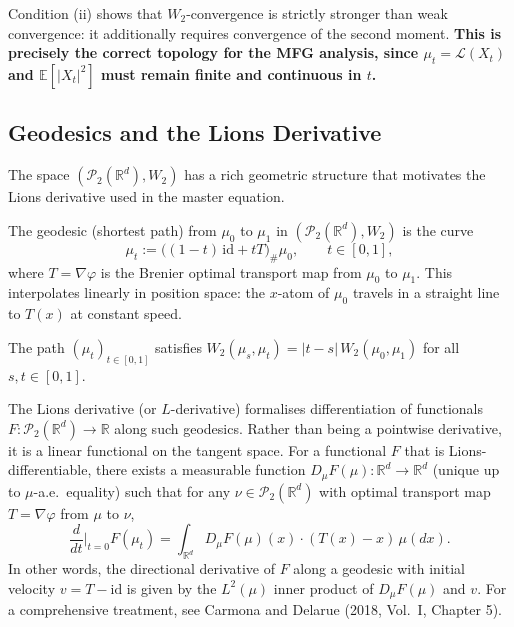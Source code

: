 Condition (ii) shows that $W_2$-convergence is strictly stronger than weak
convergence: it additionally requires convergence of the second moment. \textbf{This
is precisely the correct topology for the MFG analysis, since $\mu_t = \mathcal{L}(X_t)$
and $\mathbb{E}[|X_t|^2]$ must remain finite and continuous in $t$.}

\subsection{Geodesics and the Lions Derivative}

The space $(\mathcal{P}_2(\mathbb{R}^d), W_2)$ has a rich geometric structure that
motivates the Lions derivative used in the master equation.

\begin{definition}
The geodesic (shortest path) from $\mu_0$ to $\mu_1$ in $(\mathcal{P}_2(\mathbb{R}^d), W_2)$
is the curve
\[
    \mu_t := \big((1-t)\,\mathrm{id} + t T\big)_\# \mu_0, \qquad t \in [0,1],
\]
where $T = \nabla\varphi$ is the Brenier optimal transport map from $\mu_0$ to $\mu_1$.
This interpolates linearly in position space: the $x$-atom of $\mu_0$ travels in a
straight line to $T(x)$ at constant speed.
\end{definition}

\begin{proposition}
The path $(\mu_t)_{t \in [0,1]}$ satisfies $W_2(\mu_s, \mu_t) = |t-s|\, W_2(\mu_0,\mu_1)$
for all $s,t \in [0,1]$.
\end{proposition}

The Lions derivative (or $L$-derivative) formalises differentiation of functionals
$F : \mathcal{P}_2(\mathbb{R}^d) \to \mathbb{R}$ along such geodesics. Rather than
being a pointwise derivative, it is a linear functional on the tangent space. For a
functional $F$ that is Lions-differentiable, there exists a measurable function
$D_\mu F(\mu) : \mathbb{R}^d \to \mathbb{R}^d$ (unique up to $\mu$-a.e.\ equality) such
that for any $\nu \in \mathcal{P}_2(\mathbb{R}^d)$ with optimal transport map
$T = \nabla\varphi$ from $\mu$ to $\nu$,
\begin{equation}
    \frac{d}{dt}\Big|_{t=0} F(\mu_t) = \int_{\mathbb{R}^d} D_\mu F(\mu)(x) \cdot (T(x) -
    x)\, \mu(dx).
    \label{eq:lions-derivative}
\end{equation}
In other words, the directional derivative of $F$ along a geodesic with initial
velocity $v = T - \mathrm{id}$ is given by the $L^2(\mu)$ inner product of
$D_\mu F(\mu)$ and $v$. For a comprehensive treatment, see Carmona and Delarue (2018,
Vol.\ I, Chapter 5).

